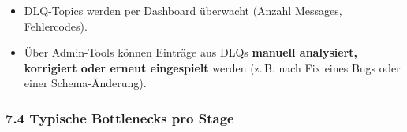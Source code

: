 \begin{itemize}
  \begin{itemize}
  \tightlist
  \item
    DLQ-Topics werden per Dashboard überwacht (Anzahl Messages,
    Fehlercodes).\\
  \item
    Über Admin-Tools können Einträge aus DLQs \textbf{manuell
    analysiert, korrigiert oder erneut eingespielt} werden (z.\,B. nach
    Fix eines Bugs oder einer Schema-Änderung).
  \end{itemize}
\end{itemize}

\subsubsection{7.4 Typische Bottlenecks pro
Stage}\label{typische-bottlenecks-pro-stage}

